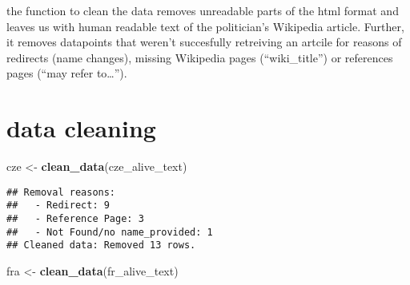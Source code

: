 \documentclass[
]{article}
\newenvironment{Shaded}{\begin{snugshade}}{\end{snugshade}}
\newcommand{\CommentTok}[1]{\textcolor[rgb]{0.56,0.35,0.01}{\textit{#1}}}
\newcommand{\ControlFlowTok}[1]{\textcolor[rgb]{0.13,0.29,0.53}{\textbf{#1}}}
\newcommand{\DecValTok}[1]{\textcolor[rgb]{0.00,0.00,0.81}{#1}}
\newcommand{\FunctionTok}[1]{\textcolor[rgb]{0.13,0.29,0.53}{\textbf{#1}}}
\newcommand{\NormalTok}[1]{#1}
\newcommand{\OtherTok}[1]{\textcolor[rgb]{0.56,0.35,0.01}{#1}}
\newcommand{\SpecialCharTok}[1]{\textcolor[rgb]{0.81,0.36,0.00}{\textbf{#1}}}
\newcommand{\StringTok}[1]{\textcolor[rgb]{0.31,0.60,0.02}{#1}}
\begin{document}
\begin{Shaded}
\end{Shaded}

the function to clean the data removes unreadable parts of the html
format and leaves us with human readable text of the politician's
Wikipedia article. Further, it removes datapoints that weren't
succesfully retreiving an artcile for reasons of redirects (name
changes), missing Wikipedia pages (``wiki\_title'') or references pages
(``may refer to\ldots{}'').

\hypertarget{data-cleaning}{%
\section{data cleaning}\label{data-cleaning}}

\begin{Shaded}
\begin{Highlighting}[]
\NormalTok{cze }\OtherTok{\textless{}{-}} \FunctionTok{clean\_data}\NormalTok{(cze\_alive\_text)}
\end{Highlighting}
\end{Shaded}

\begin{verbatim}
## Removal reasons:
##   - Redirect: 9 
##   - Reference Page: 3 
##   - Not Found/no name_provided: 1 
## Cleaned data: Removed 13 rows.
\end{verbatim}

\begin{Shaded}
\begin{Highlighting}[]
\NormalTok{fra }\OtherTok{\textless{}{-}} \FunctionTok{clean\_data}\NormalTok{(fr\_alive\_text)}
\end{Highlighting}
\end{Shaded}
\end{document}
